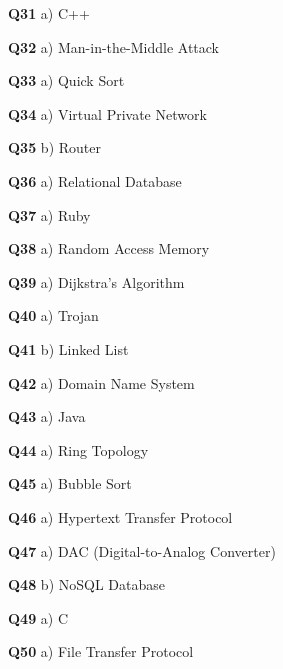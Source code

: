 \textbf{Q31} a) C++\par
\textbf{Q32} a) Man-in-the-Middle Attack\par
\textbf{Q33} a) Quick Sort\par
\textbf{Q34} a) Virtual Private Network\par
\textbf{Q35} b) Router\par
\textbf{Q36} a) Relational Database\par
\textbf{Q37} a) Ruby\par
\textbf{Q38} a) Random Access Memory\par
\textbf{Q39} a) Dijkstra's Algorithm\par
\textbf{Q40} a) Trojan\par
\textbf{Q41} b) Linked List\par
\textbf{Q42} a) Domain Name System\par
\textbf{Q43} a) Java\par
\textbf{Q44} a) Ring Topology\par
\textbf{Q45} a) Bubble Sort\par
\textbf{Q46} a) Hypertext Transfer Protocol\par
\textbf{Q47} a) DAC (Digital-to-Analog Converter)\par
\textbf{Q48} b) NoSQL Database\par
\textbf{Q49} a) C\par
\textbf{Q50} a) File Transfer Protocol\par